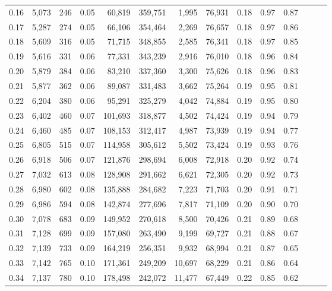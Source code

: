 \begin{tabular}{rrrrrrrrrrrrrr}
0.16 &  5,073 &    246 &  0.05 &   60,819 &  359,751 &   1,995 &  76,931 &  0.18 &  0.97 &      0.87 \\
0.17 &  5,287 &    274 &  0.05 &   66,106 &  354,464 &   2,269 &  76,657 &  0.18 &  0.97 &      0.86 \\
0.18 &  5,609 &    316 &  0.05 &   71,715 &  348,855 &   2,585 &  76,341 &  0.18 &  0.97 &      0.85 \\
0.19 &  5,616 &    331 &  0.06 &   77,331 &  343,239 &   2,916 &  76,010 &  0.18 &  0.96 &      0.84 \\
0.20 &  5,879 &    384 &  0.06 &   83,210 &  337,360 &   3,300 &  75,626 &  0.18 &  0.96 &      0.83 \\
0.21 &  5,877 &    362 &  0.06 &   89,087 &  331,483 &   3,662 &  75,264 &  0.19 &  0.95 &      0.81 \\
0.22 &  6,204 &    380 &  0.06 &   95,291 &  325,279 &   4,042 &  74,884 &  0.19 &  0.95 &      0.80 \\
0.23 &  6,402 &    460 &  0.07 &  101,693 &  318,877 &   4,502 &  74,424 &  0.19 &  0.94 &      0.79 \\
0.24 &  6,460 &    485 &  0.07 &  108,153 &  312,417 &   4,987 &  73,939 &  0.19 &  0.94 &      0.77 \\
0.25 &  6,805 &    515 &  0.07 &  114,958 &  305,612 &   5,502 &  73,424 &  0.19 &  0.93 &      0.76 \\
0.26 &  6,918 &    506 &  0.07 &  121,876 &  298,694 &   6,008 &  72,918 &  0.20 &  0.92 &      0.74 \\
0.27 &  7,032 &    613 &  0.08 &  128,908 &  291,662 &   6,621 &  72,305 &  0.20 &  0.92 &      0.73 \\
0.28 &  6,980 &    602 &  0.08 &  135,888 &  284,682 &   7,223 &  71,703 &  0.20 &  0.91 &      0.71 \\
0.29 &  6,986 &    594 &  0.08 &  142,874 &  277,696 &   7,817 &  71,109 &  0.20 &  0.90 &      0.70 \\
0.30 &  7,078 &    683 &  0.09 &  149,952 &  270,618 &   8,500 &  70,426 &  0.21 &  0.89 &      0.68 \\
0.31 &  7,128 &    699 &  0.09 &  157,080 &  263,490 &   9,199 &  69,727 &  0.21 &  0.88 &      0.67 \\
0.32 &  7,139 &    733 &  0.09 &  164,219 &  256,351 &   9,932 &  68,994 &  0.21 &  0.87 &      0.65 \\
0.33 &  7,142 &    765 &  0.10 &  171,361 &  249,209 &  10,697 &  68,229 &  0.21 &  0.86 &      0.64 \\
0.34 &  7,137 &    780 &  0.10 &  178,498 &  242,072 &  11,477 &  67,449 &  0.22 &  0.85 &      0.62 \\

\end{tabular}
